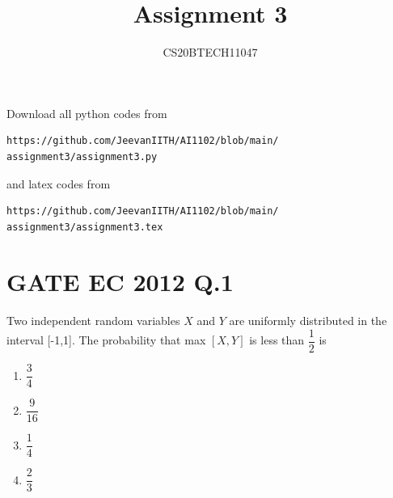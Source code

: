 \documentclass[journal,12pt,twocolumn]{IEEEtran}
\begin{document}
\let\vec\mathbf
\renewcommand{\thefigure}{\theproblem}
\def\putbox#1#2#3{\makebox[0in][l]{\makebox[#1][l]{}\raisebox{\baselineskip}[0in][0in]{\raisebox{#2}[0in][0in]{#3}}}}
     \def\rightbox#1{\makebox[0in][r]{#1}}
     \def\centbox#1{\makebox[0in]{#1}}
     \def\topbox#1{\raisebox{-\baselineskip}[0in][0in]{#1}}
     \def\midbox#1{\raisebox{-0.5\baselineskip}[0in][0in]{#1}}
\vspace{3cm}
\title{Assignment 3}
\author{CS20BTECH11047}
\maketitle
\newpage
\bigskip
\renewcommand{\thefigure}{\arabic{figure}}
\renewcommand{\thetable}{\arabic{table}}
Download all python codes from 
\begin{lstlisting}
https://github.com/JeevanIITH/AI1102/blob/main/
assignment3/assignment3.py
\end{lstlisting}
%
and latex codes from 
%
\begin{lstlisting}
https://github.com/JeevanIITH/AI1102/blob/main/
assignment3/assignment3.tex
\end{lstlisting}
\section*{GATE EC 2012 Q.1}
Two independent random variables $X$ and $Y$ are uniformly distributed in the interval [-1,1]. The probability that max $[X,Y]$ is less than $\dfrac{1}{2}$ is 
\begin{multicols}{4}
\begin{enumerate}
\item $\dfrac{3}{4}$
\item $\dfrac{9}{16}$
\item $\dfrac{1}{4}$
\item $\dfrac{2}{3}$
\end{enumerate}
\end{multicols}
\end{document}
